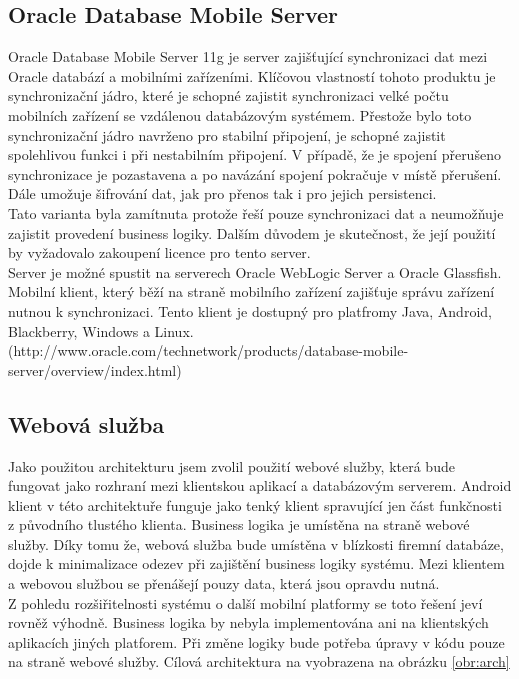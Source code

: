 \documentclass{bakalarka}
\begin{document}
\subsection{Oracle Database Mobile Server}
Oracle Database Mobile Server 11g je server zajišťující  synchronizaci dat mezi Oracle databází a mobilními zařízeními. Klíčovou vlastností tohoto produktu je synchronizační jádro, které je schopné zajistit synchronizaci velké počtu mobilních zařízení se vzdálenou databázovým systémem. Přestože bylo toto synchronizační jádro navrženo pro stabilní připojení, je schopné zajistit spolehlivou funkci i při nestabilním připojení. V případě, že je spojení přerušeno synchronizace je pozastavena a po navázání spojení pokračuje v místě přerušení. Dále umožuje šifrování dat, jak pro přenos tak i pro jejich persistenci.\\ \indent
Tato varianta byla zamítnuta protože řeší pouze synchronizaci dat a neumožňuje zajistit provedení business logiky. Dalším důvodem je skutečnost, že její použití by vyžadovalo zakoupení licence pro tento server.\\ \indent
Server je možné spustit na serverech Oracle WebLogic Server a Oracle Glassfish. Mobilní klient, který běží na straně mobilního zařízení zajišťuje správu zařízení nutnou k synchronizaci. Tento klient je dostupný pro platfromy Java, Android, Blackberry, Windows a Linux.
(http://www.oracle.com/technetwork/products/database-mobile-server/overview/index.html)

\subsection{Webová služba}
Jako použitou architekturu jsem zvolil použití webové služby, která bude fungovat jako rozhraní mezi klientskou aplikací a databázovým serverem. Android klient v této architektuře funguje jako tenký klient spravující jen část funkčnosti z původního tlustého klienta. Business logika je umístěna na straně webové služby. Díky tomu že, webová služba bude umístěna v blízkosti firemní databáze, dojde k minimalizace odezev při zajištění business logiky systému. Mezi klientem a webovou službou se přenášejí pouzy data, která jsou opravdu nutná. \\ \indent
Z pohledu rozšiřitelnosti systému o další mobilní platformy se toto řešení jeví rovněž výhodně. Business logika by nebyla implementována ani na klientských aplikacích jiných platforem. Při změne logiky bude potřeba úpravy v kódu pouze na straně webové služby. Cílová architektura na vyobrazena na obrázku \ref{obr:arch}
\end{document}
